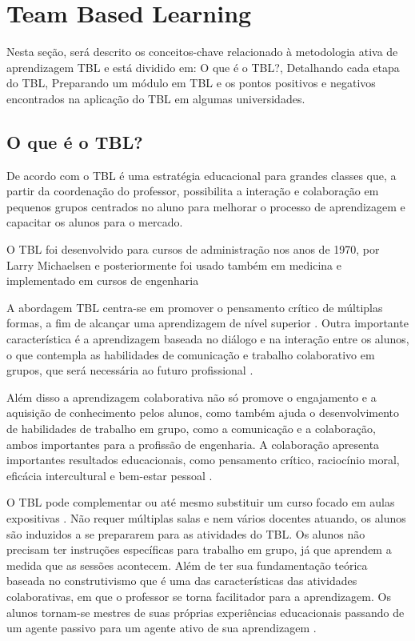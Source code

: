 \section{Team Based Learning}

Nesta seção, será descrito os conceitos-chave relacionado à metodologia ativa de aprendizagem TBL e está dividido em: O que é o TBL?, Detalhando cada etapa do TBL, Preparando um módulo em TBL e os pontos positivos e negativos encontrados na aplicação do TBL em algumas universidades.

\subsection{O que é o TBL?}

De acordo com \cite{burgess} o TBL é uma estratégia educacional para grandes classes que, a partir da coordenação do professor, possibilita a interação e colaboração em pequenos grupos centrados no aluno para melhorar o processo de aprendizagem e capacitar os alunos para o mercado.

O TBL foi desenvolvido para cursos de administração nos anos de 1970, por Larry Michaelsen \cite{sweet} e posteriormente foi usado também em medicina e implementado em cursos de engenharia \cite{matalonga}

A abordagem TBL centra-se em promover o pensamento crítico de múltiplas formas, a fim de alcançar uma aprendizagem de nível superior \cite{gomez}. Outra importante característica é a aprendizagem baseada no diálogo e na interação entre os alunos, o que contempla as habilidades de comunicação e trabalho colaborativo em grupos, que será necessária ao futuro profissional \cite{bollela}.

Além disso a aprendizagem colaborativa não só  promove o engajamento e a aquisição de conhecimento pelos alunos, como também ajuda o desenvolvimento de habilidades de trabalho em grupo, como a comunicação e a colaboração, ambos importantes para a profissão de engenharia. A colaboração apresenta importantes resultados educacionais, como pensamento crítico, raciocínio moral, eficácia intercultural e bem-estar pessoal \cite{cabrera}.

O TBL pode complementar ou até mesmo substituir um curso focado em aulas expositivas \cite{dean}. Não requer múltiplas salas e nem vários docentes atuando, os alunos são induzidos a se prepararem para as atividades do TBL. Os alunos não precisam ter instruções específicas para trabalho em grupo, já que aprendem a medida que as sessões acontecem. Além de ter sua fundamentação teórica baseada no construtivismo que é uma das características das atividades colaborativas, em que o professor se torna facilitador para a aprendizagem. Os alunos tornam-se mestres de suas próprias experiências educacionais passando de um agente passivo para um agente ativo de sua aprendizagem \cite{bollela}.

